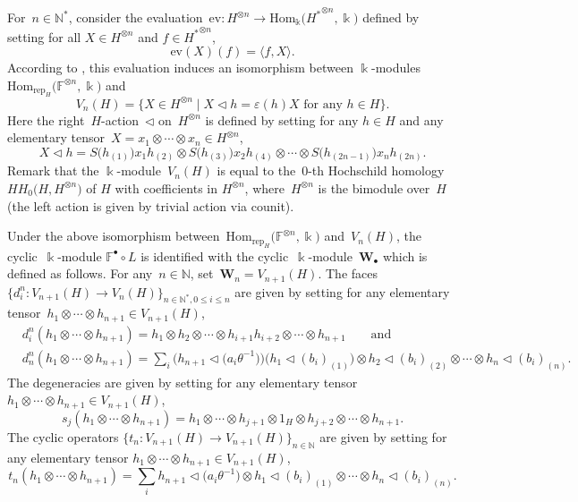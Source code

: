 \documentclass[pdftex]{sigma}
\numberwithin{equation}{section}
\newcommand{\co}{\colon}
\newcommand{\tens}{\otimes}
\newcommand{\N}{\mathbb{N}}
\newcommand{\Hom}{\mathrm{Hom}}
\newcommand{\kk}{\Bbbk}
\newcommand{\coend}{\mathbb{F}}
\newcommand{\rep}[1]{\text{rep}_{#1}}
\newcommand{\ltrn}{\triangleleft}
\begin{document}
For~$n\in \N^*$, consider the evaluation~$\text{ev}\co H^{\tens n} \to \Hom_\kk\bigl({{H^{*}}^{\tens n}}, \kk\bigr)$ defined by setting for all $X\in H^{\tens n}$ and $f \in {{H^{*}}^{\tens n}}$,
\[
\text{ev}(X)(f)=\langle f,X \rangle.
\]
According to \cite[Lemma 4.5\,$(d)$]{virelizier_2006}, this evaluation induces an isomorphism between $\kk$-modules $\Hom_{\rep{H}}\bigl(\coend^{\tens n}, \kk\bigr)$ and
\[
V_n(H) = \bigl\{X \in H^{\tens n} \mid X\ltrn h = \varepsilon(h)X \text{ for any } h\in H\bigr\}.
\]
Here the right~$H$-action~$\ltrn$ on~$H^{\tens n}$ is defined by setting for any $h\in H$ and any elementary tensor~$X=x_1\tens \cdots \tens x_n \in H^{\tens n}$,
\[
X\ltrn h = S\bigl(h_{(1)}\bigr)x_1h_{(2)} \tens S\bigl(h_{(3)}\bigr)x_2h_{(4)}\tens \cdots \tens S\bigl(h_{(2n-1)}\bigr)x_nh_{(2n)}.
\]
Remark that the $\kk$-module~$V_n(H)$ is equal to the~$0$-th Hochschild homology $HH_0\bigl(H, H^{\tens n}\bigr)$ of $H$ with coefficients in $H^{\tens n}$, where~$H^{\tens n}$ is the bimodule over~$H$ (the left action is given by trivial action via counit).

Under the above isomorphism between~$\Hom_{\rep{H}}\bigl(\coend^{\tens n}, \kk\bigr)$ and~$V_n(H)$, the cyclic~$\kk$-module $\coend^\bullet\circ L$ is identified with the cyclic~$\kk$-module~$\textbf{W}_\bullet$ which is defined as follows. For any~$n\in \N$, set~$\textbf{W}_n=V_{n+1}(H)$.
The faces~$\{d_i^n \co V_{n+1}(H) \to V_{n}(H)\}_{n \in \N^*, 0\le i \le n}$ are given by setting for any elementary tensor~$h_1\otimes\cdots\otimes h_{n+1} \in V_{n+1}(H)$,
\begin{align*}
	&d_i^n(h_1\otimes\cdots\otimes h_{n+1})=
	h_1\otimes h_2\otimes\cdots \otimes h_{i+1}h_{i+2}\otimes\cdots \otimes h_{n+1} \qquad \text{and} \\
	&d_n^n(h_1\otimes \cdots\otimes h_{n+1})=\sum_i\bigl(h_{n+1}\ltrn \bigl(a_i\theta^{-1}\bigr)\bigr)\bigl(h_1\ltrn (b_i)_{(1)}\bigr)\otimes h_2\ltrn (b_i)_{(2)}\otimes \cdots\otimes h_n\ltrn (b_i)_{(n)}.
\end{align*}
The degeneracies \smash{$\bigl\{s_j^n \co V_{n+1}(H) \to V_{n+2}(H)\bigr\}_{n\in \N, 0\le j \le n}$} are given by setting for any elementary tensor $h_1\otimes\cdots\otimes h_{n+1} \in V_{n+1}(H)$,
\[
s_j(h_1\otimes \cdots\otimes h_{n+1})=
	h_1\otimes\cdots\otimes h_{j+1}\otimes 1_H\otimes h_{j+2}\otimes \cdots \otimes h_{n+1}.
\]
The cyclic operators $\{t_n \co V_{n+1}(H) \to V_{n+1}(H)\}_{n\in \N}$ are given by setting for any elementary tensor $h_1\otimes\cdots\otimes h_{n+1} \in V_{n+1}(H)$,
\[
t_n(h_1\tens \cdots \tens h_{n+1})= \sum_i h_{n+1}\ltrn \bigl(a_i\theta^{-1}\bigr)\tens h_1\ltrn (b_i)_{(1)} \otimes \cdots\otimes h_n\ltrn (b_i)_{(n)}.\]
\end{document}

